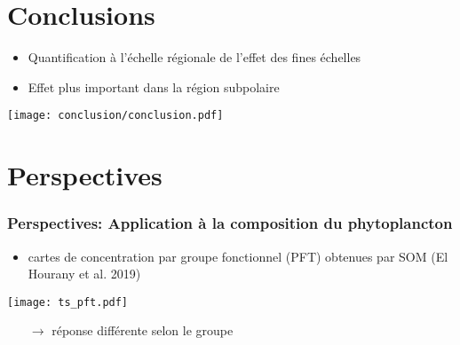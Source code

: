 \documentclass[11pt, french, aspectratio=32]{beamer}
\begin{document}

\section{Conclusions}

\begin{frame}


  \begin{itemize}
          \setlength{\itemsep}{0.8em}
    \item Quantification à l'échelle régionale de l'effet des fines échelles
    \item Effet plus important dans la région subpolaire
  \end{itemize}


  \texttt{[image: conclusion/conclusion.pdf]}

\end{frame}

\section{Perspectives}


\begin{frame}
  \frametitle{Perspectives: Application à la composition du phytoplancton}

  \begin{itemize}
    \item cartes de concentration par groupe fonctionnel (PFT) obtenues par SOM (El Hourany et al. 2019)
  \end{itemize}

  \vfill
  \texttt{[image: ts\_pft.pdf]}
  \vfill

  \begin{itemize}
    \item[$\longrightarrow$] réponse différente selon le groupe
  \end{itemize}
\end{frame}
\end{document}
